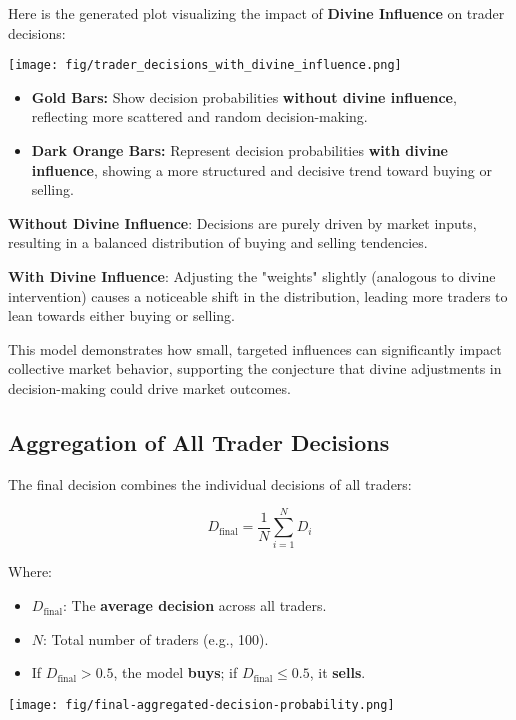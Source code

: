 \documentclass{article}
\newcommand{\bn}{\bigskip\noindent}
\begin{document}
\pagebreak
Here is the generated plot visualizing the impact of {\bf Divine Influence} on trader decisions:
\begin{center}
\texttt{[image: fig/trader\_decisions\_with\_divine\_influence.png]}
\end{center}

\begin{itemize}
\item {\bf Gold Bars:} Show decision probabilities {\bf without divine influence}, reflecting more scattered and random decision-making.  
\item {\bf Dark Orange Bars:} Represent decision probabilities {\bf with divine influence}, showing a more structured and decisive trend toward buying or selling.
\end{itemize}

\bn
{\bf Without Divine Influence}: Decisions are purely driven by market inputs, resulting in a balanced distribution of buying and selling tendencies.

\bn
{\bf With Divine Influence}: Adjusting the "weights" slightly (analogous to divine intervention) causes a noticeable shift in the distribution, leading more traders to lean towards either buying or selling.

\bn
This model demonstrates how small, targeted influences can significantly impact collective market behavior, supporting the conjecture that divine adjustments in decision-making could drive market outcomes.

\subsection{Aggregation of All Trader Decisions}
The final decision combines the individual decisions of all traders:

$$
D_{\text{final}} = \frac{1}{N} \sum_{i=1}^{N} D_i
$$

Where:  
\begin{itemize}
\item $D_{\text{final}}$: The {\bf average decision} across all traders.  
\item  $N $: Total number of traders (e.g., 100).  
\item  If $ D_{\text{final}} > 0.5$, the model {\bf buys}; if $D_{\text{final}} \leq 0.5 $, it {\bf sells}.
\end{itemize}

\begin{center}
\texttt{[image: fig/final-aggregated-decision-probability.png]}
\end{center}
\end{document}
